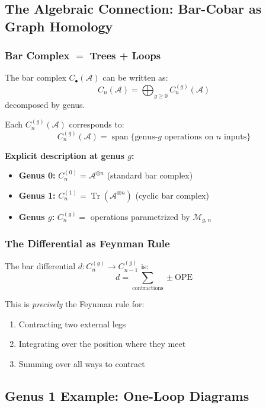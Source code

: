 \subsection{The Algebraic Connection: Bar-Cobar as Graph Homology}

\subsubsection{Bar Complex $=$ Trees + Loops}

The bar complex $C_{\bullet}(\mathcal{A})$ can be written as:
$$C_n(\mathcal{A}) = \bigoplus_{g \geq 0} C_n^{(g)}(\mathcal{A})$$
decomposed by genus.

Each $C_n^{(g)}(\mathcal{A})$ corresponds to:
$$C_n^{(g)}(\mathcal{A}) = \operatorname{span}\{ \text{genus-}g\text{ operations on }n\text{ inputs} \}$$

\textbf{Explicit description at genus $g$:}
\begin{itemize}
\item \textbf{Genus 0:} $C_n^{(0)} = \mathcal{A}^{\otimes n}$ (standard bar complex)

\item \textbf{Genus 1:} $C_n^{(1)} = \operatorname{Tr}(\mathcal{A}^{\otimes n})$
(cyclic bar complex)

\item \textbf{Genus $g$:} $C_n^{(g)} = $ operations parametrized by $\mathcal{M}_{g,n}$
\end{itemize}

\subsubsection{The Differential as Feynman Rule}

The bar differential $d: C_n^{(g)} \to C_{n-1}^{(g)}$ is:
$$d = \sum_{\text{contractions}} \pm \text{OPE}$$

This is \emph{precisely} the Feynman rule for:
\begin{enumerate}
\item Contracting two external legs
\item Integrating over the position where they meet
\item Summing over all ways to contract
\end{enumerate}

\subsection{Genus 1 Example: One-Loop Diagrams}

